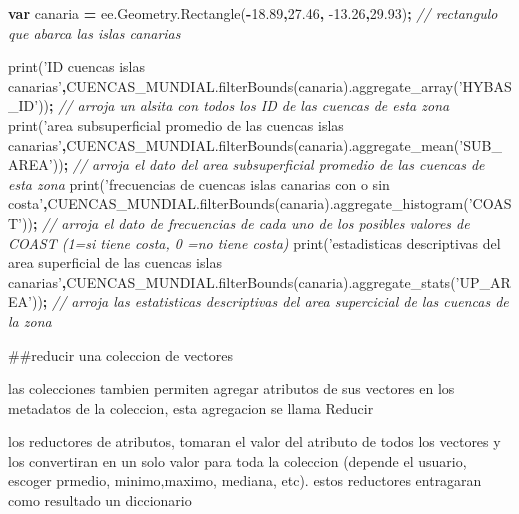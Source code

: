 \documentclass[
]{article}
\newenvironment{Shaded}{\begin{snugshade}}{\end{snugshade}}
\newcommand{\AttributeTok}[1]{\textcolor[rgb]{0.77,0.63,0.00}{#1}}
\newcommand{\CommentTok}[1]{\textcolor[rgb]{0.56,0.35,0.01}{\textit{#1}}}
\newcommand{\FloatTok}[1]{\textcolor[rgb]{0.00,0.00,0.81}{#1}}
\newcommand{\KeywordTok}[1]{\textcolor[rgb]{0.13,0.29,0.53}{\textbf{#1}}}
\newcommand{\NormalTok}[1]{#1}
\newcommand{\OperatorTok}[1]{\textcolor[rgb]{0.81,0.36,0.00}{\textbf{#1}}}
\newcommand{\StringTok}[1]{\textcolor[rgb]{0.31,0.60,0.02}{#1}}
\newcommand{\VariableTok}[1]{\textcolor[rgb]{0.00,0.00,0.00}{#1}}
\begin{document}
\begin{Shaded}
\begin{Highlighting}[]
\KeywordTok{var}\NormalTok{ canaria }\OperatorTok{=} \VariableTok{ee}\NormalTok{.}\VariableTok{Geometry}\NormalTok{.}\AttributeTok{Rectangle}\NormalTok{(}\OperatorTok{-}\FloatTok{18.89}\OperatorTok{,}\FloatTok{27.46}\OperatorTok{,} \FloatTok{-13.26}\OperatorTok{,}\FloatTok{29.93}\NormalTok{)}\OperatorTok{;} \CommentTok{// rectangulo que abarca las islas canarias}

\AttributeTok{print}\NormalTok{(}\StringTok{'ID cuencas islas canarias'}\OperatorTok{,}\VariableTok{CUENCAS_MUNDIAL}\NormalTok{.}\AttributeTok{filterBounds}\NormalTok{(canaria).}\AttributeTok{aggregate_array}\NormalTok{(}\StringTok{'HYBAS_ID'}\NormalTok{))}\OperatorTok{;} \CommentTok{// arroja un alsita con todos los ID de las cuencas de esta zona}
\AttributeTok{print}\NormalTok{(}\StringTok{'area subsuperficial promedio de las cuencas islas canarias'}\OperatorTok{,}\VariableTok{CUENCAS_MUNDIAL}\NormalTok{.}\AttributeTok{filterBounds}\NormalTok{(canaria).}\AttributeTok{aggregate_mean}\NormalTok{(}\StringTok{'SUB_AREA'}\NormalTok{))}\OperatorTok{;} \CommentTok{// arroja el dato del area subsuperficial promedio de las cuencas de esta zona}
\AttributeTok{print}\NormalTok{(}\StringTok{'frecuencias de cuencas islas canarias con o sin costa'}\OperatorTok{,}\VariableTok{CUENCAS_MUNDIAL}\NormalTok{.}\AttributeTok{filterBounds}\NormalTok{(canaria).}\AttributeTok{aggregate_histogram}\NormalTok{(}\StringTok{'COAST'}\NormalTok{))}\OperatorTok{;} \CommentTok{// arroja el dato de frecuencias de cada uno de los posibles valores de COAST (1=si tiene costa, 0 =no tiene costa)}
\AttributeTok{print}\NormalTok{(}\StringTok{'estadisticas descriptivas del area superficial de las cuencas islas canarias'}\OperatorTok{,}\VariableTok{CUENCAS_MUNDIAL}\NormalTok{.}\AttributeTok{filterBounds}\NormalTok{(canaria).}\AttributeTok{aggregate_stats}\NormalTok{(}\StringTok{'UP_AREA'}\NormalTok{))}\OperatorTok{;} \CommentTok{// arroja las estatisticas descriptivas del area supercicial de las cuencas de la zona}
\end{Highlighting}
\end{Shaded}

\#\#reducir una coleccion de vectores

las colecciones tambien permiten agregar atributos de sus vectores en
los metadatos de la coleccion, esta agregacion se llama Reducir

los reductores de atributos, tomaran el valor del atributo de todos los
vectores y los convertiran en un solo valor para toda la coleccion
(depende el usuario, escoger prmedio, minimo,maximo, mediana, etc).
estos reductores entragaran como resultado un diccionario
\end{document}
